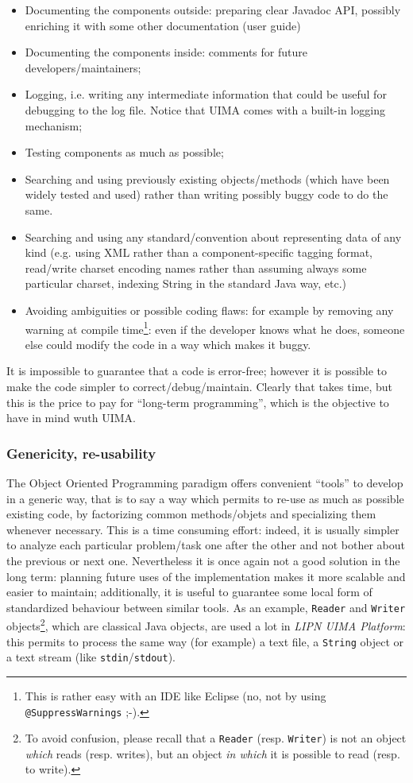 \documentclass{article}
\newcommand{\softName}{{\em LIPN UIMA Platform}\xspace}
\newenvironment{xitemize}{
\begin{itemize}
  \setlength{\itemsep}{.3\baselineskip}
  \setlength{\topsep}{0pt}
  \setlength{\parskip}{0pt}
  \setlength{\parsep}{0pt}
}{\end{itemize}}
\begin{document}
\begin{xitemize}
\item Documenting the components outside: preparing clear Javadoc API, possibly enriching it with some other documentation (user guide)
\item Documenting the components inside: comments for future developers/maintainers;
\item Logging, i.e. writing any intermediate information that could be useful for debugging to the log file. Notice that UIMA comes with a built-in logging mechanism;
\item Testing components as much as possible;
\item Searching and using previously existing objects/methods (which have been widely tested and used) rather than writing possibly buggy code to do the same.
\item Searching and using any standard/convention about representing data of any kind (e.g. using XML rather than a component-specific tagging format, read/write charset encoding names rather than assuming always some particular charset, indexing String in the standard Java way, etc.) 
\item Avoiding ambiguities or possible coding flaws: for example by removing any warning at compile time\footnote{This is rather easy with an IDE like Eclipse (no, not by using {\tt @SuppressWarnings} ;-).}: even if the developer knows what he does, someone else could modify the code in a way which makes it buggy.
\end{xitemize}

It is impossible to guarantee that a code is error-free; however it is possible to make the code simpler to correct/debug/maintain. Clearly that takes time, but this is the price to pay for ``long-term programming'', which is the objective to have in mind wuth UIMA.

\subsubsection{Genericity, re-usability}

The Object Oriented Programming paradigm offers convenient ``tools'' to develop in a generic way, that is to say a way which permits to re-use as much as possible existing code, by factorizing common methods/objets and specializing them whenever necessary. This is a time consuming effort: indeed, it is usually simpler to analyze each particular problem/task one after the other and not bother about the previous or next one. Nevertheless it is once again not a good solution in the long term: planning future uses of the implementation makes it more scalable and easier to maintain; additionally, it is useful to guarantee some local form of standardized behaviour between similar tools. As an example, {\tt Reader} and {\tt Writer} objects\footnote{To avoid confusion, please recall that a {\tt Reader} (resp. {\tt Writer}) is not an object {\em which}  reads (resp. writes), but an object {\em in which} it is possible to read (resp. to write).}, which are classical Java objects, are used a lot in \softName: this permits to process the same way (for example) a text file, a {\tt String} object or a text stream (like {\tt stdin}/{\tt stdout}).
\end{document}
